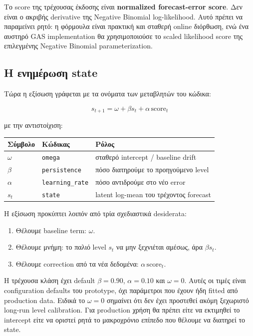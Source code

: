 \documentclass[11pt,a4paper]{article}
\newcommand{\equationnote}[1]{
  \begin{center}
    \colorbox{boxblue}{\parbox{0.92\linewidth}{\begin{equation*}#1\end{equation*}}}
  \end{center}
}
\newcommand{\code}[1]{\texttt{#1}}
\begin{document}
Το score της τρέχουσας έκδοσης είναι \textbf{normalized forecast-error
score}. Δεν είναι ο ακριβής derivative της Negative Binomial log-likelihood.
Αυτό πρέπει να παραμείνει ρητό: η φόρμουλα είναι πρακτική και σταθερή
online διόρθωση, ενώ ένα αυστηρό GAS implementation θα χρησιμοποιούσε το
scaled likelihood score της επιλεγμένης Negative Binomial parameterization.

\subsection{Η ενημέρωση state}

Τώρα η εξίσωση γράφεται με τα ονόματα των μεταβλητών του κώδικα:

\equationnote{
  s_{t+1} = \omega + \beta s_t + \alpha\,\text{score}_t
}

με την αντιστοίχιση:

\begin{center}
\begin{tabular}{lll}
\toprule
\textbf{Σύμβολο} & \textbf{Κώδικας} & \textbf{Ρόλος}\\
\midrule
$\omega$ & \code{omega} & σταθερό intercept / baseline drift\\
$\beta$ & \code{persistence} & πόσο διατηρούμε το προηγούμενο level\\
$\alpha$ & \code{learning\_rate} & πόσο αντιδρούμε στο νέο error\\
$s_t$ & \code{state} & latent log-mean του τρέχοντος forecast\\
\bottomrule
\end{tabular}
\end{center}

Η εξίσωση προκύπτει λοιπόν από τρία σχεδιαστικά desiderata:

\begin{enumerate}
  \item Θέλουμε baseline term: $\omega$.
  \item Θέλουμε μνήμη: το παλιό level $s_t$ να μην ξεχνιέται αμέσως,
        άρα $\beta s_t$.
  \item Θέλουμε correction από τα νέα δεδομένα: $\alpha\,\text{score}_t$.
\end{enumerate}

Η τρέχουσα κλάση έχει default $\beta=0.90$, $\alpha=0.10$ και $\omega=0$.
Αυτές οι τιμές είναι configuration defaults του prototype, όχι παράμετροι
που έχουν ήδη fitted από production data. Ειδικά το $\omega=0$ σημαίνει ότι
δεν έχει προστεθεί ακόμη ξεχωριστό long-run level calibration. Για production
χρήση θα πρέπει είτε να εκτιμηθεί το intercept είτε να οριστεί ρητά το
μακροχρόνιο επίπεδο που θέλουμε να διατηρεί το state.
\end{document}
